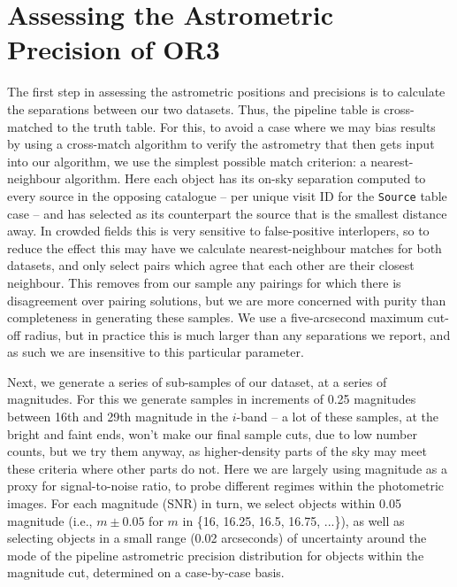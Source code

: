 \documentclass[SE,lsstdraft,authoryear,toc]{lsstdoc}
\begin{document}
\section{Assessing the Astrometric Precision of OR3}
\label{sec:assessing_the_or3_precision}
The first step in assessing the astrometric positions and precisions is to calculate the separations between our two datasets.
Thus, the pipeline table is cross-matched to the truth table.
For this, to avoid a case where we may bias results by using a cross-match algorithm to verify the astrometry that then gets input into our algorithm, we use the simplest possible match criterion: a nearest-neighbour algorithm.
Here each object has its on-sky separation computed to every source in the opposing catalogue -- per unique visit ID for the \texttt{Source} table case -- and has selected as its counterpart the source that is the smallest distance away.
In crowded fields this is very sensitive to false-positive interlopers, so to reduce the effect this may have we calculate nearest-neighbour matches for both datasets, and only select pairs which agree that each other are their closest neighbour.
This removes from our sample any pairings for which there is disagreement over pairing solutions, but we are more concerned with purity than completeness in generating these samples.
We use a five-arcsecond maximum cut-off radius, but in practice this is much larger than any separations we report, and as such we are insensitive to this particular parameter.

Next, we generate a series of sub-samples of our dataset, at a series of magnitudes.
For this we generate samples in increments of 0.25 magnitudes between 16th and 29th magnitude in the $i$-band -- a lot of these samples, at the bright and faint ends, won't make our final sample cuts, due to low number counts, but we try them anyway, as higher-density parts of the sky may meet these criteria where other parts do not.
Here we are largely using magnitude as a proxy for signal-to-noise ratio, to probe different regimes within the photometric images.
For each magnitude (SNR) in turn, we select objects within 0.05 magnitude (i.e., $m\pm0.05$ for $m$ in \{16, 16.25, 16.5, 16.75, ...\}), as well as selecting objects in a small range (0.02 arcseconds) of uncertainty around the mode of the pipeline astrometric precision distribution for objects within the magnitude cut, determined on a case-by-case basis.
\end{document}
